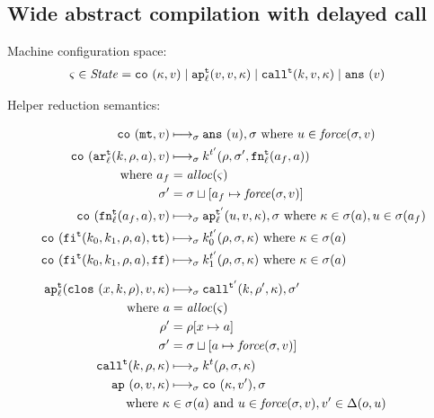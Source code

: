 \documentclass{llncs}
\newcommand{\alt}{\mid}
\begin{document}
\spchoice{ }
{
\subsection{Wide abstract compilation with delayed call}

Machine configuration space:
\begin{align*}
\mstate \in \State &= \co{\mkont, \mval} \alt
                      \ap[_\mlab^\mcntr]{\mval,\mval,\mkont} \alt
                      \call[^\mcntr]{\mcomp,\mval,\mkont} \alt
                     \ans{\mval}
\end{align*}

Helper reduction semantics:

\begin{gather*}
\begin{align*}
\co{\kmt,\mval} &\machstep_\msto
\ans{\mvalx{u}},\msto
\text{ where } \mvalx{u} \in \spchoice{\force(\msto,\mval)}{\force(\mval)}
\\
\co{\kar[^\mcntr_\mlab]{\mcomp,\menv,\maddr},\mval} & \machstep_\msto
\mcomp^{\mcntr'}(\menv,\msto',\kfn[^\mcntr_\mlab]{\maddr_f,\maddr})
\\
\text{ where }\maddr_f &= \alloc(\mstate) \\
              \msto' &= \msto\sqcup[\maddr_f \mapsto \spchoice{\force(\msto,\mval)}{\force(\mval)}]
\\
\co{\kfn[^\mcntr_\mlab]{\maddr_f,\maddr},\mval} & \machstep_\msto
\ap[^{\mcntr'}_\mlab]{\mvalx{u},\mval,\mkont},\msto
\text{ where } \mkont \in \msto(\maddr), \mvalx{u} \in \msto(\maddr_f)
\\
\co{\kif[^\mcntr]{\mcompi0,\mcompi1,\menv,\maddr},\strue} & \machstep_\msto
\mcompi0^{\mcntr'}(\menv,\msto,\mkont)
\text{ where }\mkont\in\msto(\maddr)
\\
\co{\kif[^\mcntr]{\mcompi0,\mcompi1,\menv,\maddr},\sfalse} & \machstep_\msto
\mcompi1^{\mcntr'}(\menv,\msto,\mkont)
\text{ where }\mkont\in\msto(\maddr)
\\[2mm]
\ap[^\mcntr_\mlab]{\clos{\mvar,\mcomp,\menv},\mval,\mkont} & \machstep_\msto
\call[^{\mcntr'}]{\mcomp, \menv',\mkont},\msto' \\
\text{ where }
\maddr &= \alloc(\mstate) \\
\menv' &= \menv[\mvar \mapsto \maddr] \\
\msto' &= \msto\sqcup[\maddr \mapsto \spchoice{\force(\msto, \mval)}{\force(\mval)}]
\\
\call[^\mcntr]{\mcomp,\menv,\mkont} &\machstep_\msto \mcomp^\mcntr(\menv,\msto,\mkont)
\\
\ap{\mop,\mval,\mkont} & \machstep_\msto
\co{\mkont,\mval'},\msto \\
\text{ where }\mkont &\in\msto(\maddr)
\text{ and } \mvalx{u} \in \spchoice{\force(\msto,\mval)}{\force(\mval)}, \mval'\in\interpdelta(\mop,\mvalx{u})
\end{align*}
\end{gather*}

}
\end{document}
